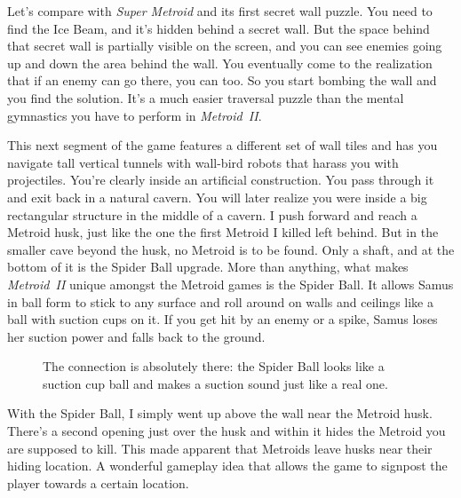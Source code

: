 \documentclass{book}
\begin{document}
\FloatBarrier\vspace{\baselineskip}\begin{figure}[H]\end{figure}
Let’s compare with \emph{Super Metroid} and its first secret wall puzzle. You need to find the Ice Beam, and it’s hidden behind a secret wall. But the space behind that secret wall is partially visible on the screen, and you can see enemies going up and down the area behind the wall. You eventually come to the realization that if an enemy can go there, you can too. So you start bombing the wall and you find the solution. It’s a much easier traversal puzzle than the mental gymnastics you have to perform in \emph{Metroid~II}.\par
This next segment of the game features a different set of wall tiles and has you navigate tall vertical tunnels with wall-bird robots that harass you with projectiles. You’re clearly inside an artificial construction. You pass through it and exit back in a natural cavern. You will later realize you were inside a big rectangular structure in the middle of a cavern. I push forward and reach a Metroid husk, just like the one the first Metroid I killed left behind. But in the smaller cave beyond the husk, no Metroid is to be found. Only a shaft, and at the bottom of it is the Spider Ball upgrade. More than anything, what makes \emph{Metroid~II} unique amongst the Metroid games is the Spider Ball. It allows Samus in ball form to stick to any surface and roll around on walls and ceilings like a ball with suction cups on it. If you get hit by an enemy or a spike, Samus loses her suction power and falls back to the ground.\par
\FloatBarrier\vspace{\baselineskip}\begin{figure}[H]\caption*{The connection is absolutely there: the Spider Ball looks like a suction cup ball and makes a suction sound just like a real one.}\end{figure}
With the Spider Ball, I simply went up above the wall near the Metroid husk. There’s a second opening just over the husk and within it hides the Metroid you are supposed to kill. This made apparent that Metroids leave husks near their hiding location. A wonderful gameplay idea that allows the game to signpost the player towards a certain location.\par
\end{document}
